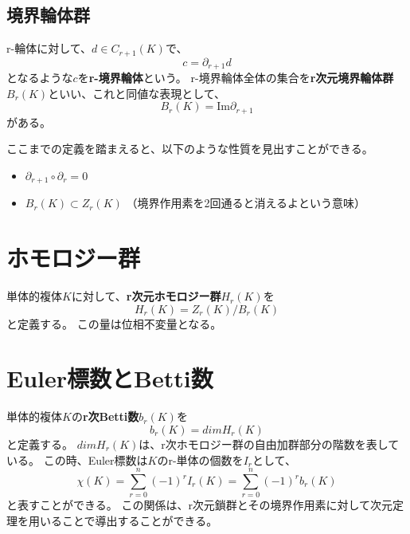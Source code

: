 \documentclass[a4paper]{jsreport}
\begin{document}
            \subsection*{境界輪体群}
                r-輪体に対して、$d \in C_{r+1}(K)$で、
                \begin{equation}
                    c = \partial_{r+1} d
                \end{equation}
                となるような$c$を\textbf{r-境界輪体}という。
                r-境界輪体全体の集合を\textbf{r次元境界輪体群}$B_r(K)$といい、これと同値な表現として、
                \begin{equation}
                    B_r(K) = \text{Im} \partial_{r+1}
                \end{equation}
                がある。

            ここまでの定義を踏まえると、以下のような性質を見出すことができる。
            \begin{itemize}
              \item $\partial_{r+1} \circ \partial_r = 0$
              \item $B_r(K) \subset Z_r(K)$ （境界作用素を2回通ると消えるよという意味）
            \end{itemize}

        \section{ホモロジー群}
            単体的複体$K$に対して、\textbf{r次元ホモロジー群}$H_r(K)$を
            \begin{equation}
                H_r(K) = Z_r(K) / B_r(K)
            \end{equation}
            と定義する。
            この量は位相不変量となる。

        \section{Euler標数とBetti数}
            単体的複体$K$の\textbf{r次Betti数}$b_r(K)$を
            \begin{equation}
                b_r(K) = dim H_r(K)
            \end{equation}
            と定義する。
            $dim H_r(K)$は、r次ホモロジー群の自由加群部分の階数を表している。
            この時、Euler標数は$K$のr-単体の個数を$I_r$として、
            \begin{equation}
                \chi(K) = \sum_{r=0}^{n} (-1)^r I_r(K) = \sum_{r=0}^{n} (-1)^r b_r(K)
            \end{equation}
            と表すことができる。
            この関係は、r次元鎖群とその境界作用素に対して次元定理を用いることで導出することができる。
\end{document}
